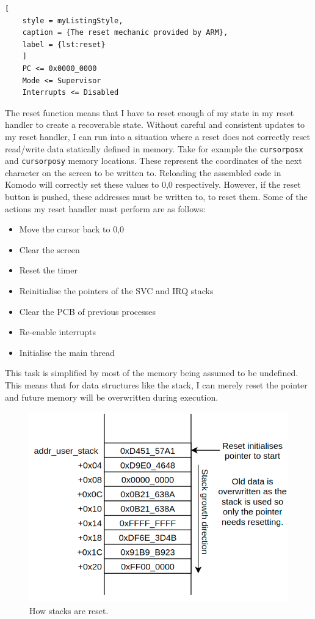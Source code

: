 \begin{lstlisting}[
	style = myListingStyle,
	caption = {The reset mechanic provided by ARM},
	label = {lst:reset}
	]
	PC <= 0x0000_0000
	Mode <= Supervisor
	Interrupts <= Disabled
\end{lstlisting}
The reset function means that I have to reset enough of my state in my reset handler to create a recoverable state. Without careful and consistent updates to my reset handler, I can run into a situation where a reset does not correctly reset read/write data statically defined in memory. Take for example the \verb|cursorposx| and \verb|cursorposy| memory locations. These represent the coordinates of the next character on the screen to be written to. Reloading the assembled code in Komodo will correctly set these values to 0,0 respectively. However, if the reset button is pushed, these addresses must be written to, to reset them. Some of the actions my reset handler must perform are as follows:

\begin{itemize}
	\item Move the cursor back to 0,0
	\item Clear the screen
	\item Reset the timer
	\item Reinitialise the pointers of the SVC and IRQ stacks
	\item Clear the PCB of previous processes
	\item Re-enable interrupts
	\item Initialise the main thread
\end{itemize}

This task is simplified by most of the memory being assumed to be undefined. This means that for data structures like the stack, I can merely reset the pointer and future memory will be overwritten during execution.

\begin{figure}[H]
	\includegraphics[width=\linewidth]{figures/reset.png}
	\caption{How stacks are reset.}
	\label{fig:reset}
\end{figure} 


